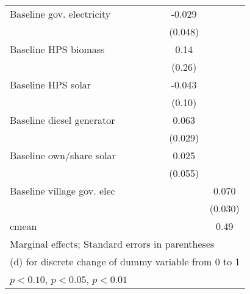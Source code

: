 \begin{table}[htbp]
\begin{tabular*}{1\hsize}{@{\hskip\tabcolsep\extracolsep\fill}l*{6}{c}}
Baseline gov. electricity&                  &                  &                  &                  &   -0.029         &                  \\
                &                  &                  &                  &                  &  (0.048)         &                  \\
Baseline HPS biomass&                  &                  &                  &                  &     0.14         &                  \\
                &                  &                  &                  &                  &   (0.26)         &                  \\
Baseline HPS solar&                  &                  &                  &                  &   -0.043         &                  \\
                &                  &                  &                  &                  &   (0.10)         &                  \\
Baseline diesel generator&                  &                  &                  &                  &    0.063\sym{**} &                  \\
                &                  &                  &                  &                  &  (0.029)         &                  \\
Baseline own/share solar&                  &                  &                  &                  &    0.025         &                  \\
                &                  &                  &                  &                  &  (0.055)         &                  \\
Baseline village gov. elec&                  &                  &                  &                  &                  &    0.070\sym{**} \\
                &                  &                  &                  &                  &                  &  (0.030)         \\
\midrule
cmean           &                  &                  &                  &                  &                  &     0.49         \\
\bottomrule
\multicolumn{7}{l}{\footnotesize Marginal effects; Standard errors in parentheses}\\
\multicolumn{7}{l}{\footnotesize  (d) for discrete change of dummy variable from 0 to 1}\\
\multicolumn{7}{l}{\footnotesize \sym{*} \(p<0.10\), \sym{**} \(p<0.05\), \sym{***} \(p<0.01\)}\\
\end{tabular*}
\end{table}
